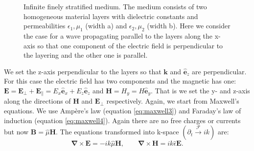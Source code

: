 \begin{figure}[h]
    \centering
    
    \caption{Infinite finely stratified medium. The medium consists of two homogeneous material layers with dielectric constants and permeabilities $\epsilon_1, \mu_1$ (width a) and $\epsilon_2, \mu_2$ (width b). Here we consider the case for a wave propagating parallel to the layers along the x-axis so that one component of the electric field is perpendicular to the layering and the other one is parallel.}
    \label{fig:tikz_rytov_derivation}
\end{figure}

We set the z-axis perpendicular to the layers so that $\bm{k}$ and $\hat{\bm{e}}_z$ are perpendicular. For this case the electric field has two components and the magnetic has one: $\bm{E}=\bm{E_{\bot}} + \bm{E_{\parallel}} = E_x \hat{\bm{e}}_x + E_{z} \hat{\bm{e}}_z$ and $\bm{H}=H_y=H \hat{\bm{e}}_y$. That is we set the y- and z-axis along the directions of $\bm{H}$ and $\bm{E_{\bot}}$ respectively. Again, we start from Maxwell's equations. We use Ampère's law (equation \ref{eq:maxwell3}) and Faraday's law of induction (equation \ref{eq:maxwell4}). Again there are no free charges or currents but now $\bm{B} = \hat{\mu} \bm{H}$. The equations transformed into k-space $(\partial_t \xrightarrow{\mathscr{F}} ik)$ are:
\begin{equation}
    \label{eq:rytov_maxwell_initial}
    \bm{\nabla}\times\bm{E} =-ik \hat{\mu} \bm{H},
    \qquad
    \bm{\nabla}\times\bm{H} = ik \hat{\epsilon} \bm{E}.
\end{equation}

